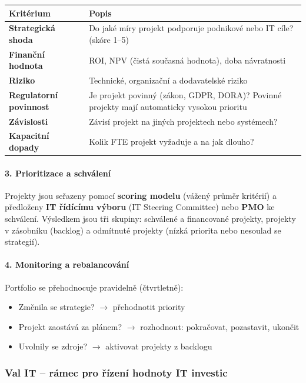 \begin{center}
\begin{tabular}{p{3.5cm}p{8.5cm}}
\toprule
\textbf{Kritérium} & \textbf{Popis} \\
\midrule
\textbf{Strategická shoda} & Do jaké míry projekt podporuje podnikové nebo IT cíle? (skóre 1--5) \\
\textbf{Finanční hodnota} & ROI, NPV (čistá současná hodnota), doba návratnosti \\
\textbf{Riziko} & Technické, organizační a dodavatelské riziko \\
\textbf{Regulatorní povinnost} & Je projekt povinný (zákon, GDPR, DORA)? Povinné projekty mají automaticky vysokou prioritu \\
\textbf{Závislosti} & Závisí projekt na jiných projektech nebo systémech? \\
\textbf{Kapacitní dopady} & Kolik FTE projekt vyžaduje a na jak dlouho? \\
\bottomrule
\end{tabular}
\end{center}

\paragraph{3. Prioritizace a schválení}
Projekty jsou seřazeny pomocí \textbf{scoring modelu} (vážený průměr kritérií) a předloženy
\textbf{IT řídícímu výboru} (IT Steering Committee) nebo \textbf{PMO} ke schválení.
Výsledkem jsou tři skupiny: schválené a financované projekty, projekty v zásobníku (backlog)
a odmítnuté projekty (nízká priorita nebo nesoulad se strategií).

\paragraph{4. Monitoring a rebalancování}
Portfolio se přehodnocuje pravidelně (čtvrtletně):
\begin{itemize}
  \item Změnila se strategie? $\to$ přehodnotit priority
  \item Projekt zaostává za plánem? $\to$ rozhodnout: pokračovat, pozastavit, ukončit
  \item Uvolnily se zdroje? $\to$ aktivovat projekty z backlogu
\end{itemize}

\subsubsection{Val IT -- rámec pro řízení hodnoty IT investic}

